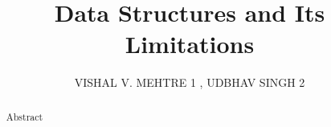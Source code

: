 \documentclass{rmf-d}
\begin{document}

\title{Data Structures and Its Limitations
\vspace{-6pt}}
\author{  VISHAL V. MEHTRE 1
, UDBHAV SINGH 2       }
\address{1 Assistant Professor, Department of Electrical Engineering, Bharati Vidyapeeth Deemed University,
College of Engineering, Pune, India}
\address{2 Assistant Professor, Department of Electrical Engineering, Bharati Vidyapeeth Deemed University,
College of Engineering, Pune, India
}

\author{ }
\address{ }
\author{ }
\address{ }
\author{ }
\address{ }
\author{ }
\address{ }
\author{ }
\address{ }
\maketitle

\begin{abstract}
Abstract
\end{abstract}
\end{document}
